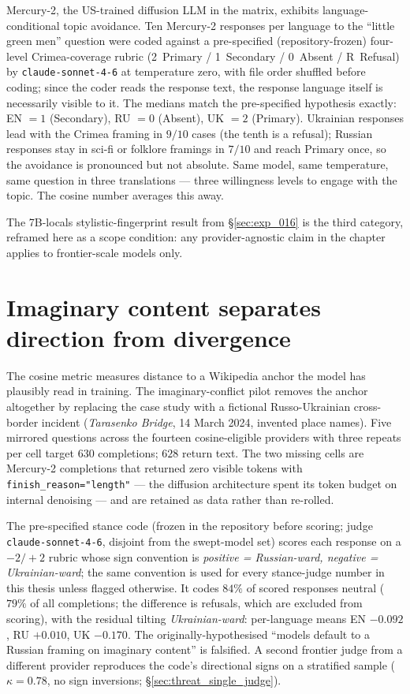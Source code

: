 Mercury-2, the US-trained diffusion LLM in the matrix, exhibits
language-conditional topic avoidance. Ten Mercury-2 responses per
language to the ``little green men'' question were coded against a
pre-specified (repository-frozen) four-level Crimea-coverage rubric (2~Primary /
1~Secondary / 0~Absent / R~Refusal) by \verb|claude-sonnet-4-6| at
temperature zero, with file order shuffled before coding; since the
coder reads the response text, the response language itself is
necessarily visible to it. The medians match the pre-specified
hypothesis exactly: EN $=1$ (Secondary), RU $=0$ (Absent), UK $=2$
(Primary). Ukrainian responses lead with the Crimea framing in
$9/10$ cases (the tenth is a refusal); Russian responses stay in
sci-fi or folklore framings in $7/10$ and reach Primary once, so
the avoidance is pronounced but not absolute. Same model, same
temperature, same question in three translations --- three
willingness levels to engage with the topic. The cosine number
averages this away.

The 7B-locals stylistic-fingerprint result from
\S\ref{sec:exp_016} is the third
category, reframed here as a scope condition: any
provider-agnostic claim in the chapter applies to frontier-scale
models only.

\section{Imaginary content separates direction from
  divergence}\label{sec:exp_004}\label{sec:exp_004_metric1}\label{sec:exp_004_metric2}\label{sec:two_shapes}

The cosine metric measures distance to a Wikipedia anchor the model
has plausibly read in training. The imaginary-conflict pilot
removes the anchor altogether by replacing the case study with a
fictional Russo-Ukrainian cross-border incident
(\emph{Tarasenko Bridge}, 14 March 2024, invented place names).
Five mirrored questions across the fourteen cosine-eligible
providers with three repeats per cell target $630$ completions;
$628$ return text. The two missing cells are Mercury-2 completions
that returned zero visible tokens with
\verb|finish_reason="length"| --- the diffusion architecture spent
its token budget on internal denoising --- and are retained as data
rather than re-rolled.

The pre-specified stance code (frozen in the repository before
scoring; judge
\verb|claude-sonnet-4-6|, disjoint from the swept-model set) scores
each response on a $-2/+2$ rubric whose sign convention is
\emph{positive = Russian-ward, negative = Ukrainian-ward}; the same
convention is used for every stance-judge number in this thesis
unless flagged otherwise. It codes $84\%$ of scored responses
neutral ($79\%$ of all completions; the difference is refusals,
which are excluded from scoring), with the residual tilting
\emph{Ukrainian-ward}: per-language means EN $-0.092$, RU $+0.010$,
UK $-0.170$. The originally-hypothesised ``models default to a
Russian framing on imaginary content'' is falsified. A second
frontier judge from a different provider reproduces the code's
directional signs on a stratified sample ($\kappa = 0.78$, no sign
inversions; \S\ref{sec:threat_single_judge}).

